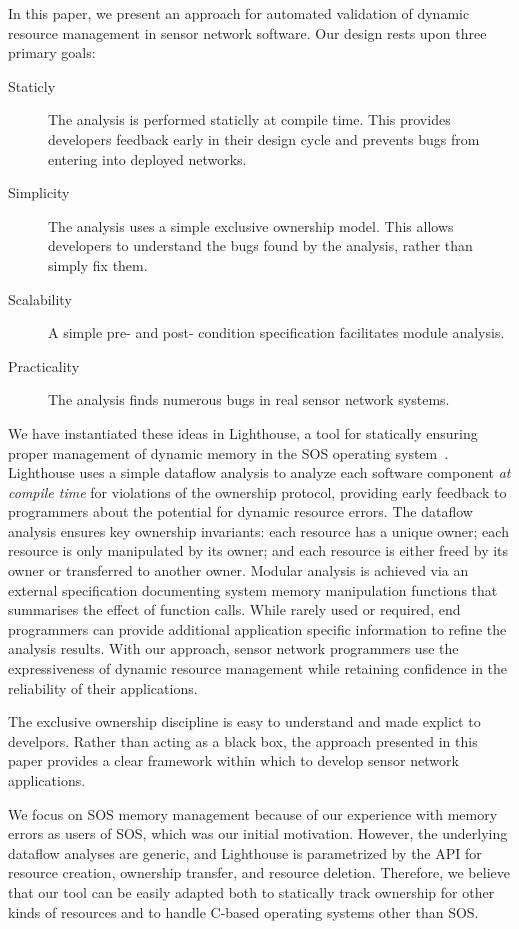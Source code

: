 In this paper, we present an approach for automated validation of dynamic
resource management in sensor network software.  
%
Our design rests upon three primary goals:
%
\begin{description}
%
\item[Staticly] The analysis is performed staticlly at compile time.  This
provides developers feedback early in their design cycle and prevents bugs
from entering into deployed networks.
%
\item[Simplicity]  The analysis uses a simple exclusive ownership model.
%
This allows developers to understand the bugs found by the analysis, rather
than simply fix them.
%
\item[Scalability]  A simple pre- and post- condition specification
facilitates module analysis.
%
\item[Practicality] The analysis finds numerous bugs in real sensor network
systems.
%
\end{description}
%



We have instantiated these ideas in Lighthouse, a tool for statically
ensuring proper management of dynamic memory in the SOS operating
system~\cite{sos}.  
%
Lighthouse uses a simple dataflow analysis to analyze each software
component {\em at compile time} for violations of the ownership protocol,
providing early feedback to programmers about the potential for dynamic
resource errors.  
%
The dataflow analysis ensures key ownership invariants:  each resource has a
unique owner; each resource is only manipulated by its owner; and each
resource is either freed by its owner or transferred to another owner.  
%
Modular analysis is achieved via an external specification documenting
system memory manipulation functions that summarises the effect of function
calls.
%
While rarely used or required, end programmers can provide additional
application specific information to refine the analysis results.
%
With our approach, sensor network programmers use the expressiveness of
dynamic resource management while retaining confidence in the reliability of
their applications.



The exclusive ownership discipline is easy to understand and made explict to
develpors.
%
Rather than acting as a black box, the approach presented in this paper
provides a clear framework within which to develop sensor network
applications.


We focus on SOS memory management because of our experience with memory
errors as users of SOS, which was our initial motivation.  
%
However, the underlying dataflow analyses are generic, and Lighthouse is
parametrized by the API for resource creation, ownership transfer, and
resource deletion.  
%
Therefore, we believe that our tool can be easily adapted both to statically
track ownership for other kinds of resources and to handle C-based operating
systems other than SOS.



